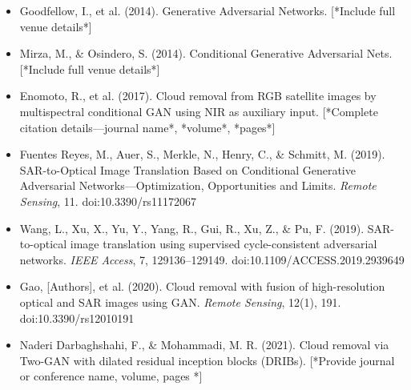 \begin{itemize}
    \item Goodfellow, I., et al. (2014). Generative Adversarial Networks. [*Include full venue details*]

    \item Mirza, M., & Osindero, S. (2014). Conditional Generative Adversarial Nets. [*Include full venue details*]

    \item Enomoto, R., et al. (2017). Cloud removal from RGB satellite images by multispectral conditional GAN using NIR as auxiliary input. [*Complete citation details—journal name*, *volume*, *pages*]

    \item Fuentes Reyes, M., Auer, S., Merkle, N., Henry, C., & Schmitt, M. (2019). SAR-to-Optical Image Translation Based on Conditional Generative Adversarial Networks—Optimization, Opportunities and Limits. \textit{Remote Sensing}, 11. doi:10.3390/rs11172067

    \item Wang, L., Xu, X., Yu, Y., Yang, R., Gui, R., Xu, Z., & Pu, F. (2019). SAR-to-optical image translation using supervised cycle-consistent adversarial networks. \textit{IEEE Access}, 7, 129136–129149. doi:10.1109/ACCESS.2019.2939649

    \item Gao, [Authors], et al. (2020). Cloud removal with fusion of high-resolution optical and SAR images using GAN. \textit{Remote Sensing}, 12(1), 191. doi:10.3390/rs12010191

    \item Naderi Darbaghshahi, F., & Mohammadi, M. R. (2021). Cloud removal via Two-GAN with dilated residual inception blocks (DRIBs). [*Provide journal or conference name, volume, pages *]

    
\end{itemize}
